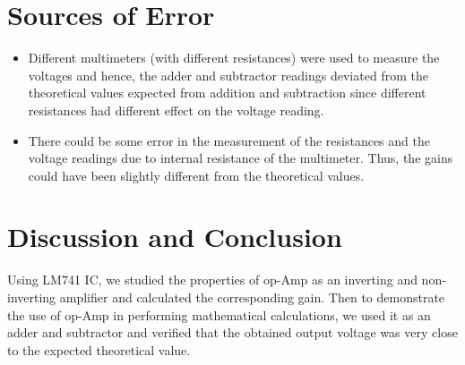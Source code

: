 \documentclass{scrartcl}
\begin{document}
\section{Sources of Error}
\begin{itemize}
    \item Different multimeters (with different resistances) were used to measure the voltages and hence, the adder and subtractor readings deviated from the theoretical values expected from addition and subtraction since different resistances had different effect on the voltage reading.
    \item There could be some error in the measurement of the resistances and the voltage readings due to internal resistance of the multimeter. Thus, the gains could have been slightly different from the theoretical values.
\end{itemize}
\section{Discussion and Conclusion} 
Using LM741 IC, we studied the properties of op-Amp as an inverting and non-inverting amplifier and calculated the corresponding gain. Then to demonstrate the use of op-Amp in performing mathematical calculations, we used it as an adder and subtractor and verified that the obtained output voltage was very close to the expected theoretical value. 
\end{document}
